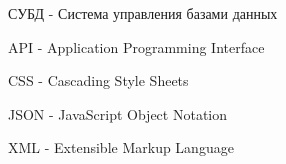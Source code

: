 




\label{ax:listing}




СУБД - Система управления базами данных

API - Application Programming Interface

CSS - Cascading Style Sheets

JSON - JavaScript Object Notation

XML - Extensible Markup Language


